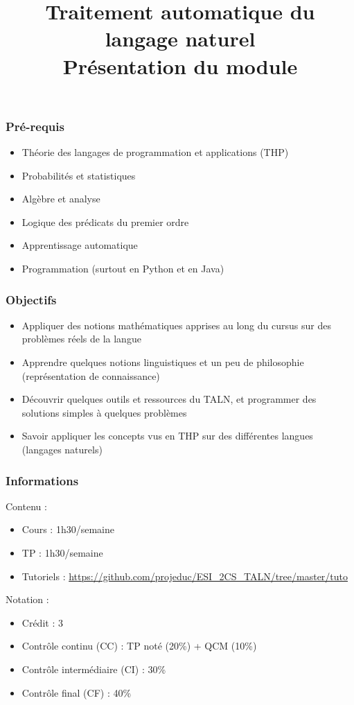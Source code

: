 \documentclass{beamer}
\title[TALN : Présentation] %
{Traitement automatique du langage naturel\\Présentation du module}
\begin{document}
\begin{frame}
\frametitle{Pré-requis}

\begin{itemize}
	\item Théorie des langages de programmation et applications (THP)
	\item Probabilités et statistiques
	\item Algèbre et analyse 
	\item Logique des prédicats du premier ordre
	\item Apprentissage automatique 
	\item Programmation (surtout en Python et en Java)
\end{itemize}

\end{frame}


\begin{frame}
\frametitle{Objectifs}

\begin{itemize}
	\item Appliquer des notions mathématiques apprises au long du cursus sur des problèmes réels de la langue 
	\item Apprendre quelques notions linguistiques et un peu de philosophie (représentation de connaissance) 
	\item Découvrir quelques outils et ressources du TALN, et programmer des solutions simples à quelques problèmes
	\item Savoir appliquer les concepts vus en THP sur des différentes langues (langages naturels)
\end{itemize}

\end{frame}


\begin{frame}
\frametitle{Informations}

Contenu :
\begin{itemize}
	\item Cours : 1h30/semaine
	\item TP : 1h30/semaine
	\item Tutoriels : {\scriptsize\url{https://github.com/projeduc/ESI_2CS_TALN/tree/master/tuto}}
\end{itemize}

Notation :
\begin{itemize}
	\item Crédit : 3
	\item Contrôle continu (CC) : TP noté (20\%) + QCM (10\%)
	\item Contrôle intermédiaire (CI) : 30\%
	\item Contrôle final (CF) : 40\%
\end{itemize}

\end{frame}
\end{document}

